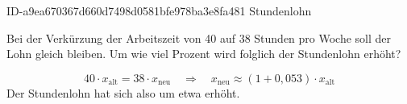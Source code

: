 \begin{exercise}
      {ID-a9ea670367d660d7498d0581bfe978ba3e8fa481}
      {Stundenlohn}
  \ifproblem\problem\par
    Bei der Verkürzung der Arbeitszeit von 40 auf 38 Stunden pro Woche
    soll der Lohn gleich bleiben. Um wie viel Prozent wird folglich der
    Stundenlohn erhöht?
  \fi
  \ifoutcome\outcome\par
    \begin{equation*}
      40\cdot x_{\text{alt}}=38\cdot x_{\text{neu}}
      \quad\Rightarrow\quad
      x_{\text{neu}}\approx(1+0,\!053)\cdot x_{\text{alt}}
    \end{equation*}
    Der Stundenlohn hat sich also um etwa  erhöht.
  \fi
\end{exercise}
